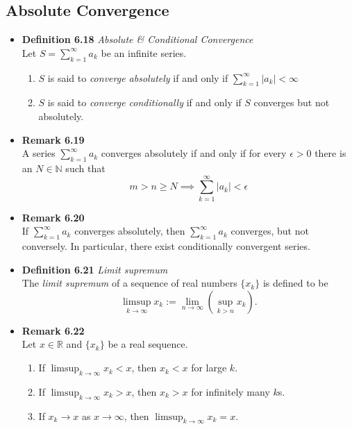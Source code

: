 \documentclass[11pt,a4paper]{article}
\begin{document}
\subsection{Absolute Convergence}

\begin{itemize}
    \item \textbf{Definition 6.18} \emph{Absolute \& Conditional Convergence} \\
        Let $S = \sum_{k=1}^\infty a_k$ be an infinite series.
        \begin{enumerate}
            \item $S$ is said to \emph{converge absolutely} if and only if
                $\sum_{k=1}^\infty |a_k| < \infty$
            \item $S$ is said to \emph{converge conditionally} if and only if $S$ converges
                but not absolutely.
        \end{enumerate}

    \item \textbf{Remark 6.19} \\
        A series $\sum_{k=1}^\infty a_k$ converges absolutely if and only if for every
        $\epsilon > 0$ there is an $N \in \mathbb{N}$ such that
        \[
            m > n \geq N \implies \sum_{k=1}^\infty |a_k| < \epsilon
        \]

    \item \textbf{Remark 6.20} \\
        If $\sum_{k=1}^\infty a_k$ converges absolutely, then $\sum_{k=1}^\infty a_k$
        converges, but not conversely.
        In particular, there exist conditionally convergent series.

    \item \textbf{Definition 6.21} \emph{Limit supremum} \\
        The \emph{limit supremum} of a sequence of real numbers $\{x_k\}$ is defined to be
        \[
            \limsup_{k \to \infty} x_k := \lim_{n \to \infty} \left( \sup_{k>n} x_k \right).
        \]

    \item \textbf{Remark 6.22} \\
        Let $x \in \mathbb{R}$ and $\{x_k\}$ be a real sequence.
        \begin{enumerate}
            \item If $\limsup_{k \to \infty} x_k < x$, then $x_k < x$ for large $k$.
            \item If $\limsup_{k \to \infty} x_k > x$, then $x_k > x$ for infinitely many $k$s.
            \item If $x_k \to x$ as $x \to \infty$, then $\limsup_{k \to \infty} x_k = x$.
        \end{enumerate}


\end{itemize}
\end{document}
